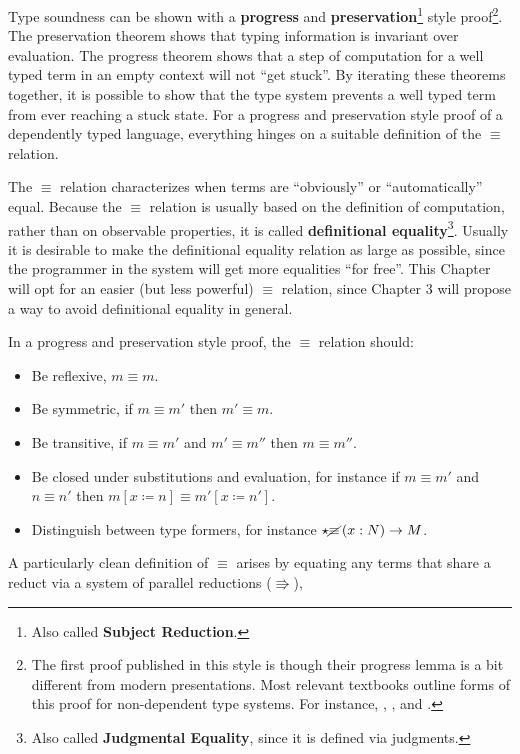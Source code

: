 Type soundness can be shown with a \textbf{progress} and \textbf{preservation}\footnote{
  Also called \textbf{Subject Reduction}.
} style proof\footnote{
  The first proof published in this style is \cite{WRIGHT199438} though their progress lemma is a bit different from modern presentations.
  Most relevant textbooks outline forms of this proof for non-dependent type systems.
  For instance, \cite[Part 2]{pierce2002types}, \cite{KOKKE2020102440}, and \cite[Chapter 11]{chlipala2017formal}.
}. 
The preservation theorem shows that typing information is invariant over evaluation.
The progress theorem shows that a step of computation for a well typed term in an empty context will not ``get stuck''.
By iterating these theorems together, it is possible to show that the type system prevents a well typed term from ever reaching a stuck state.
For a progress and preservation style proof of a dependently typed language, everything hinges on a suitable definition of the $\equiv$ relation.
 
The $\equiv$ relation characterizes when terms are ``obviously'' or ``automatically'' equal.
Because the $\equiv$ relation is usually based on the definition of computation, rather than on observable properties, it is called \textbf{definitional equality}\footnote{
  Also called \textbf{Judgmental Equality}, since it is defined via judgments.
}.
Usually it is desirable to make the definitional equality relation as large as possible, since the programmer in the system will get more equalities ``for free''.
This Chapter will opt for an easier (but less powerful) $\equiv$ relation, since Chapter 3 will propose a way to avoid definitional equality in general.
 
In a progress and preservation style proof, the $\equiv$ relation should:
 
\begin{itemize}
\item Be reflexive, $m\equiv m$.
\item Be symmetric, if $m\equiv m'$ then $m'\equiv m$. %
\item Be transitive, if $m\equiv m'$ and $m'\equiv m''$ then $m\equiv m''$.
\item Be closed under substitutions and evaluation, for instance if $m\equiv m'$ and $n\equiv n'$ then $m\left[x\coloneqq n\right]\equiv m'\left[x\coloneqq n'\right]$.
\item Distinguish between type formers, for instance $\star\cancel{\equiv}\left(x:N\right)\rightarrow M$.
\end{itemize}
A particularly clean definition of $\equiv$ arises by equating any terms that share a reduct via a system of parallel reductions ($\Rrightarrow$),
 
